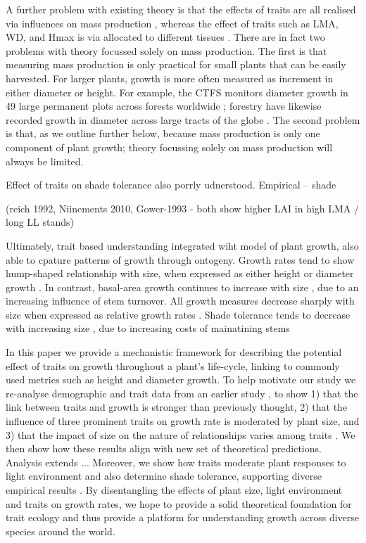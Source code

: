 \documentclass[12pt, a4paper]{article}
\begin{document}
A further problem with existing theory is that the effects of traits are all
realised via influences on mass production \citep{enquist-2007},
whereas the effect of traits such as LMA, WD, and Hmax is via allocated
to different tissues \citep{falster-2011}. There are in fact two problems with theory
focussed solely on mass production. The first is that measuring mass
production is only practical for small plants that can be easily harvested.
For larger plants, growth is more often measured as increment in either diameter
or height. For example, the CTFS monitors diameter growth in 49 large permanent
plots across forests worldwide \citep{anderson-teixeira-2015};
 forestry have likewise recorded growth in diameter across
large tracts of the globe \citep{purves-2008}. The second problem is
that, as we outline further below, because mass production is only one
component of plant growth; theory focussing solely on mass production will
 always be limited.

Effect of traits on shade tolerance also porrly udnerstood. Empirical -- shade

(reich 1992, Niinements 2010, Gower-1993 - both show higher LAI in high LMA / long LL stands)

Ultimately, trait based understanding integrated wiht model of plant growth, also able to cpature patterns of growth through ontogeny. Growth rates tend to show hump-shaped relationship with size, when expressed as either height \citep{sillett-2010, king-2011} or diameter growth \citep{herault-2011}.  In contrast, basal-area growth continues to increase with size \citep{sillett-2010, stephenson-2014}, due to an increasing influence of stem turnover. All growth measures decrease sharply with size when expressed as relative growth rates \citep{rees-2010, iida-2014}. Shade tolerance tends to decrease with increasing size \citep{lusk-2006}, due to increasing costs of mainatining stems \citep{givnish-1988}

In this paper we provide a mechanistic framework for describing the potential
effect of traits on growth throughout a plant's life-cycle, linking to
commonly used metrics such as height and diameter growth. To help motivate our
study we re-analyse demographic and trait data from an earlier study
 \citep{wright-2010}, to show 1) that the link between traits and
growth is stronger than previously thought, 2) that the influence of three
prominent traits on growth rate is moderated by plant size, and 3) that the
impact of size on the nature of relationships varies among traits
 \citep[see also]{ruger-2012}. We then show how these results align with new
set of theoretical predictions. Analysis extends ...
Moreover, we show how traits moderate plant
responses to light environment and also determine shade tolerance, supporting
diverse empirical results \citep{ruger-2012, poorter-2006}. By
disentangling the effects of plant size, light environment and traits on
growth rates, we hope to provide a solid theoretical foundation for trait
ecology and thus provide a platform for understanding growth across diverse
species around the world.
\end{document}

